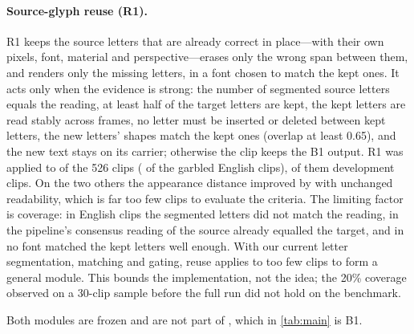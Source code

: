 \paragraph{Source-glyph reuse (R1).} R1 keeps the source letters that are already correct in place---with their own pixels, font, material and perspective---erases only the wrong span between them, and renders only the missing letters, in a font chosen to match the kept ones. It acts only when the evidence is strong: the number of segmented source letters equals the reading, at least half of the target letters are kept, the kept letters are read stably across frames, no letter must be inserted or deleted between kept letters, the new letters' shapes match the kept ones (overlap at least 0.65), and the new text stays on its carrier; otherwise the clip keeps the B1 output. R1 was applied to \rReuseApplied{} of the 526 clips (\rReuseGarbledEn{} of the \rGarbledEn{} garbled English clips), \rReuseAppliedDev{} of them development clips. On the two others the appearance distance improved by \rReuseNDMad{} with unchanged readability, which is far too few clips to evaluate the criteria. The limiting factor is coverage: in \rReuseWhyLetters{} English clips the segmented letters did not match the reading, in \rReuseWhySource{} the pipeline's consensus reading of the source already equalled the target, and in \rReuseWhyFont{} no font matched the kept letters well enough. With our current letter segmentation, matching and gating, reuse applies to too few clips to form a general module. This bounds the implementation, not the idea; the 20\% coverage observed on a 30-clip sample before the full run did not hold on the benchmark.

Both modules are frozen and are not part of \method, which in \cref{tab:main} is B1.


